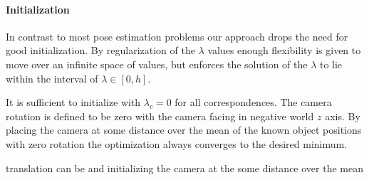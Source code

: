 \paragraph{Initialization}
In contrast to most pose estimation problems our approach drops the need for good initialization. 
By regularization of the $\lambda$ values enough flexibility is given to move over an infinite space of values, 
but enforces the solution of the $\lambda$ to lie within the interval of $\lambda \in [0, h]$.

It is sufficient to initialize with $\lambda_c = 0$ for all correspondences.
The camera rotation is defined to be zero with the camera facing in negative world $z$ axis.
By placing the camera at some distance over the mean of the known object positions with zero rotation the optimization always converges to the desired minimum.

 translation can be  and initializing the camera at the some distance over the mean    

